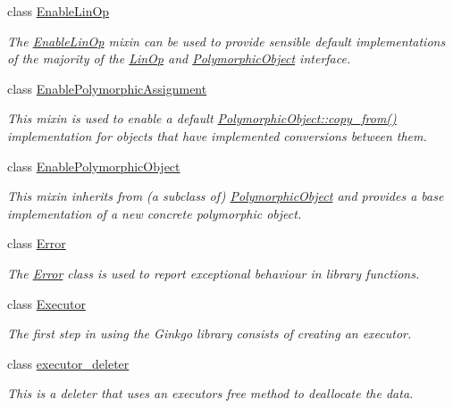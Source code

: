 \begin{DoxyCompactItemize}
class \hyperlink{classgko_1_1EnableLinOp}{Enable\+Lin\+Op}
\begin{DoxyCompactList}\small\item\em The \hyperlink{classgko_1_1EnableLinOp}{Enable\+Lin\+Op} mixin can be used to provide sensible default implementations of the majority of the \hyperlink{classgko_1_1LinOp}{Lin\+Op} and \hyperlink{classgko_1_1PolymorphicObject}{Polymorphic\+Object} interface. \end{DoxyCompactList}\item 
class \hyperlink{classgko_1_1EnablePolymorphicAssignment}{Enable\+Polymorphic\+Assignment}
\begin{DoxyCompactList}\small\item\em This mixin is used to enable a default \hyperlink{classgko_1_1PolymorphicObject_a5e6f713938293cfbe788d00480eb4d81}{Polymorphic\+Object\+::copy\+\_\+from()} implementation for objects that have implemented conversions between them. \end{DoxyCompactList}\item 
class \hyperlink{classgko_1_1EnablePolymorphicObject}{Enable\+Polymorphic\+Object}
\begin{DoxyCompactList}\small\item\em This mixin inherits from (a subclass of) \hyperlink{classgko_1_1PolymorphicObject}{Polymorphic\+Object} and provides a base implementation of a new concrete polymorphic object. \end{DoxyCompactList}\item 
class \hyperlink{classgko_1_1Error}{Error}
\begin{DoxyCompactList}\small\item\em The \hyperlink{classgko_1_1Error}{Error} class is used to report exceptional behaviour in library functions. \end{DoxyCompactList}\item 
class \hyperlink{classgko_1_1Executor}{Executor}
\begin{DoxyCompactList}\small\item\em The first step in using the Ginkgo library consists of creating an executor. \end{DoxyCompactList}\item 
class \hyperlink{classgko_1_1executor__deleter}{executor\+\_\+deleter}
\begin{DoxyCompactList}\small\item\em This is a deleter that uses an executor\textquotesingle{}s {\ttfamily free} method to deallocate the data. \end{DoxyCompactList}\item 

\end{DoxyCompactItemize}

